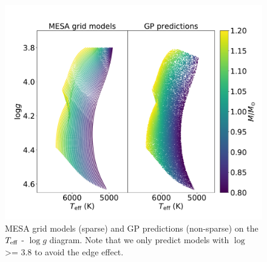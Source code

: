 \begin{figure}
	\includegraphics[width=1.0\columnwidth]{2d_hrd_compare.pdf}
    \caption{MESA grid models (sparse) and GP predictions (non-sparse) on the $T_{\rm eff}$ - $\log g$ diagram. Note that we only predict models with $\log$ >= 3.8 to avoid the edge effect. }
    \label{fig:gphrdl}
\end{figure}


